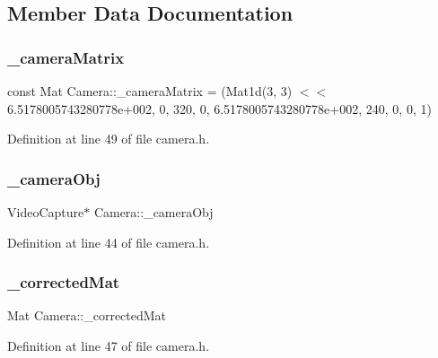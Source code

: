 \subsection{Member Data Documentation}
\mbox{\label{class_camera_a1e024292a6e5481b8719ec16c34121e6}} 
\subsubsection{\texorpdfstring{\_cameraMatrix}{\_cameraMatrix}}
{\footnotesize\ttfamily const Mat Camera\+::\+\_\+camera\+Matrix = (Mat1d(3, 3) $<$$<$ 6.\+5178005743280778e+002, 0, 320, 0, 6.\+5178005743280778e+002, 240, 0, 0, 1)\hspace{0.3cm}{\ttfamily [private]}}



Definition at line 49 of file camera.\+h.

\mbox{\label{class_camera_a4b052388a85d60aaca71726e1d8dbea9}} 
\subsubsection{\texorpdfstring{\_cameraObj}{\_cameraObj}}
{\footnotesize\ttfamily Video\+Capture$\ast$ Camera\+::\+\_\+camera\+Obj\hspace{0.3cm}{\ttfamily [private]}}



Definition at line 44 of file camera.\+h.

\mbox{\label{class_camera_aadacf0c0381546be20b9c707f8e88a42}} 
\subsubsection{\texorpdfstring{\_correctedMat}{\_correctedMat}}
{\footnotesize\ttfamily Mat Camera\+::\+\_\+corrected\+Mat\hspace{0.3cm}{\ttfamily [private]}}



Definition at line 47 of file camera.\+h.

\mbox{\label{class_camera_af0a36cb5108ca656eccd85c58508ae5f}} 
